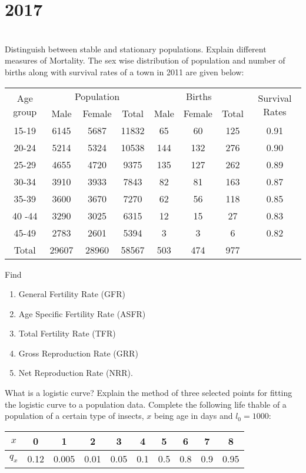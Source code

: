 \section*{2017}
\vspace{-.5cm}
\hrulefill \smallskip\\
 Distinguish between stable and stationary populations.
\myline
{} Explain different measures of Mortality.
\myline
{} The sex wise distribution of population and number of births along with survival rates of a town in 2011 are given below:
\begin{center}
    \begin{tabular}{|*{8}{c|}}\hline
    \multirow{2}{*}{Age group}& \multicolumn{3}{c|}{Population}& \multicolumn{3}{c|}{Births} &\multirow{2}{*}{Survival Rates}\\\cline{2-7}
    & Male & Female & Total & Male & Female & Total & \\\hline
    15-19 & 6145 & 5687 & 11832 & 65 & 60 & 125 & 0.91 \\
    20-24 & 5214 & 5324 & 10538 & 144 & 132 & 276 & 0.90 \\
    25-29 & 4655 & 4720 & 9375 & 135 & 127 & 262 & 0.89 \\
    30-34 & 3910 & 3933 & 7843 & 82 & 81 & 163 & 0.87 \\
    35-39 & 3600 & 3670 & 7270 & 62 & 56 & 118 & 0.85 \\
    40 -44 & 3290 & 3025 & 6315 & 12 & 15 & 27 & 0.83 \\
    45-49 & 2783 & 2601 & 5394 & 3 & 3 & 6 & 0.82 \\ \hline
    Total & 29607 & 28960 & 58567 & 503 & 474 & 977 & \\ \hline
    \end{tabular}
\end{center} Find
\begin{enumerate}[topsep=0pt, itemsep = -1ex,label=(\roman*)]
    \item General Fertility Rate (GFR)
    \item Age Specific Fertility Rate (ASFR)
    \item Total Fertility Rate (TFR)
    \item Gross Reproduction Rate (GRR)
    \item Net Reproduction Rate (NRR).
\end{enumerate}
\myline
{} What is a logistic curve? Explain the method of three selected points for fitting the logistic curve to a population data.
\myline
{} Complete the following life thable of a population of a certain type of insects, $x$ being age in days and $l_0=1000$:
\begin{center}
    \begin{tabular}{|*{10}{c|}}\hline
    $x$ & 0 & 1 & 2 & 3 & 4 & 5 & 6 & 7 & 8 \\ \hline
    $q_x$ & 0.12 & 0.005 & 0.01 & 0.05 & 0.1 & 0.5 & 0.8 & 0.9 & 0.95 \\ \hline
    \end{tabular}
\end{center}


